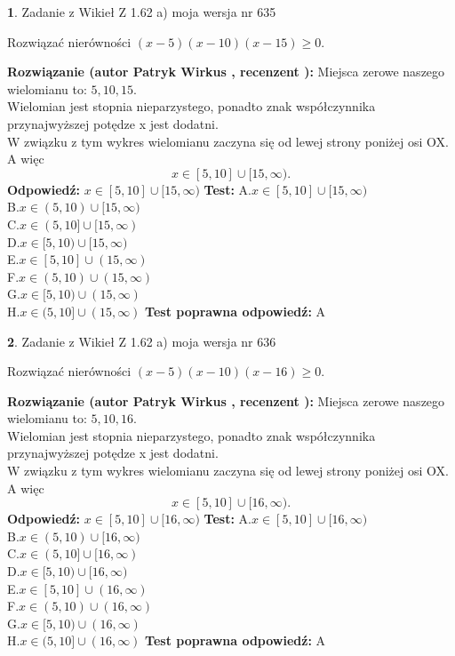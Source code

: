 \documentclass[12pt, a4paper]{article}
\theoremstyle{definition} %
\newtheorem{zad}{}
\newcommand{\zadStart}[1]{\begin{zad}#1\newline}
\newcommand{\zadStop}{\end{zad}}
\newcommand{\rozwStart}[2]{\noindent \textbf{Rozwiązanie (autor #1 , recenzent #2): }\newline}
\newcommand{\rozwStop}{\newline}
\newcommand{\odpStart}{\noindent \textbf{Odpowiedź:}\newline}
\newcommand{\odpStop}{\newline}
\newcommand{\testStart}{\noindent \textbf{Test:}\newline}
\newcommand{\testStop}{\newline}
\newcommand{\kluczStart}{\noindent \textbf{Test poprawna odpowiedź:}\newline}
\newcommand{\kluczStop}{\newline}
\begin{document}
\zadStart{Zadanie z Wikieł Z 1.62 a) moja wersja nr 635}

Rozwiązać nierówności $(x-5)(x-10)(x-15)\ge0$.
\zadStop
\rozwStart{Patryk Wirkus}{}
Miejsca zerowe naszego wielomianu to: $5, 10, 15$.\\
Wielomian jest stopnia nieparzystego, ponadto znak współczynnika przy\linebreak najwyższej potędze x jest dodatni.\\ W związku z tym wykres wielomianu zaczyna się od lewej strony poniżej osi OX. A więc $$x \in [5,10] \cup [15,\infty).$$
\rozwStop
\odpStart
$x \in [5,10] \cup [15,\infty)$
\odpStop
\testStart
A.$x \in [5,10] \cup [15,\infty)$\\
B.$x \in (5,10) \cup [15,\infty)$\\
C.$x \in (5,10] \cup [15,\infty)$\\
D.$x \in [5,10) \cup [15,\infty)$\\
E.$x \in [5,10] \cup (15,\infty)$\\
F.$x \in (5,10) \cup (15,\infty)$\\
G.$x \in [5,10) \cup (15,\infty)$\\
H.$x \in (5,10] \cup (15,\infty)$
\testStop
\kluczStart
A
\kluczStop



\zadStart{Zadanie z Wikieł Z 1.62 a) moja wersja nr 636}

Rozwiązać nierówności $(x-5)(x-10)(x-16)\ge0$.
\zadStop
\rozwStart{Patryk Wirkus}{}
Miejsca zerowe naszego wielomianu to: $5, 10, 16$.\\
Wielomian jest stopnia nieparzystego, ponadto znak współczynnika przy\linebreak najwyższej potędze x jest dodatni.\\ W związku z tym wykres wielomianu zaczyna się od lewej strony poniżej osi OX. A więc $$x \in [5,10] \cup [16,\infty).$$
\rozwStop
\odpStart
$x \in [5,10] \cup [16,\infty)$
\odpStop
\testStart
A.$x \in [5,10] \cup [16,\infty)$\\
B.$x \in (5,10) \cup [16,\infty)$\\
C.$x \in (5,10] \cup [16,\infty)$\\
D.$x \in [5,10) \cup [16,\infty)$\\
E.$x \in [5,10] \cup (16,\infty)$\\
F.$x \in (5,10) \cup (16,\infty)$\\
G.$x \in [5,10) \cup (16,\infty)$\\
H.$x \in (5,10] \cup (16,\infty)$
\testStop
\kluczStart
A
\kluczStop
\end{document}

